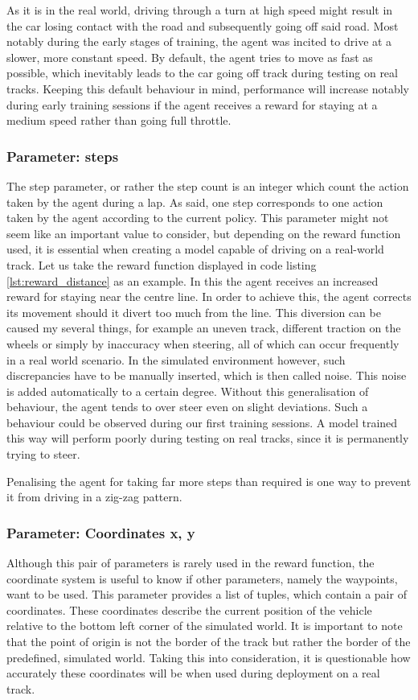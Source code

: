 As it is in the real world, driving through a turn at high speed might result in the car losing contact with the road and subsequently going off said road. Most notably during the early stages of training, the agent was incited to drive at a slower, more constant speed. By default, the agent tries to move as fast as possible, which inevitably leads to the car going off track during testing on real tracks. Keeping this default behaviour in mind, performance will increase notably during early training sessions if the agent receives a reward for staying at a medium speed rather than going full throttle.

%
%

\subsubsection{Parameter: steps}
The step parameter, or rather the step count is an integer which count the action taken by the agent during a lap. As said, one step corresponds to one action taken by the agent according to the current policy. This parameter might not seem like an important value to consider, but depending on the reward function used, it is essential when creating a model capable of driving on a real-world track.
Let us take the reward function displayed in code listing \ref{lst:reward_distance} as an example. In this the agent receives an increased reward for staying near the centre line. In order to achieve this, the agent corrects its movement should it divert too much from the line. This diversion can be caused my several things, for example an uneven track, different traction on the wheels or simply by inaccuracy when steering, all of which can occur frequently in a real world scenario. In the simulated environment however, such discrepancies have to be manually inserted, which is then called noise. This noise is added automatically to a certain degree. Without this generalisation of behaviour, the agent tends to over steer even on slight deviations. Such a behaviour could be observed during our first training sessions. A model trained this way will perform poorly during testing on real tracks, since it is permanently trying to steer.

Penalising the agent for taking far more steps than required is one way to prevent it from driving in a zig-zag pattern.

\subsubsection{Parameter: Coordinates x, y}
Although this pair of parameters is rarely used in the reward function, the coordinate system is useful to know if other parameters, namely the waypoints, want to be used. This parameter provides a list of tuples, which contain a pair of coordinates. These coordinates describe the current position of the vehicle relative to the bottom left corner of the simulated world. It is important to note that the point of origin is not the border of the track but rather the border of the predefined, simulated world. Taking this into consideration, it is questionable how accurately these coordinates will be when used during deployment on a real track.

